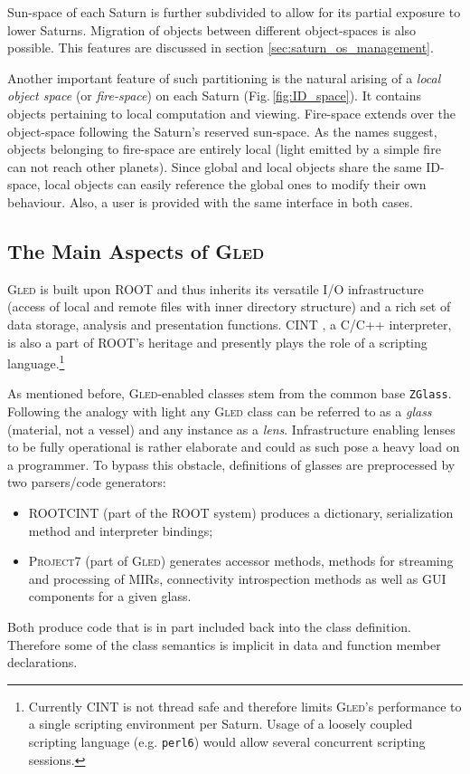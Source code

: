 \documentclass[final]{siamltex}
\def\gled{\textsc{Gled}\xspace}
\def\p7{\textsc{Project7}\xspace}
\def\smalltt#1{{\small\texttt{#1}}}
\def\foottt#1{{\footnotesize\texttt{#1}}}
\begin{document}
Sun-space of each Saturn is further subdivided to allow for its
partial exposure to lower Saturns. Migration of objects between
different object-spaces is also possible. This features are discussed
in section \ref{sec:saturn_os_management}.

Another important feature of such partitioning is the natural arising
of a \emph{local object space} (or \emph{fire-space}) on each Saturn
(Fig.\,\ref{fig:ID_space}). It contains objects pertaining to local
computation and viewing. Fire-space extends over the object-space
following the Saturn's reserved sun-space. As the names suggest,
objects belonging to fire-space are entirely local (light emitted by a
simple fire can not reach other planets). Since global and local
objects share the same ID-space, local objects can easily
reference the global ones to modify their own behaviour. Also, a
user is provided with the same interface in both cases.


\subsection{The Main Aspects of \gled}

\gled is built upon ROOT \cite{root} and thus inherits its versatile
I/O infrastructure (access of local and remote files with inner
directory structure) and a rich set of data storage, analysis and
presentation functions. CINT \cite{cint}, a C/C++ interpreter, is also
a part of ROOT's heritage and presently plays the role of a scripting
language.\footnote{Currently CINT is not thread safe and therefore
  limits \gled's performance to a single scripting environment per
  Saturn. Usage of a loosely coupled scripting language (e.g.
  \foottt{perl6}) would allow several concurrent scripting sessions.}

As mentioned before, \gled-enabled classes stem from the common base
\smalltt{ZGlass}. Following the analogy with light any \gled class can be
referred to as a \emph{glass} (material, not a vessel) and any
instance as a \emph{lens}. Infrastructure enabling lenses to be fully
operational is rather elaborate and could as such pose a heavy load on
a programmer. To bypass this obstacle, definitions of glasses are
preprocessed by two parsers/code generators:
\begin{itemize}
\item ROOTCINT (part of the ROOT system) produces
  a dictionary, serialization method and interpreter bindings;
\item \p7 (part of \gled) generates accessor methods, methods for
  streaming and processing of MIRs, connectivity introspection methods
  as well as GUI components for a given glass.
\end{itemize}
Both produce code that is in part included back into the class
definition. Therefore some of the class semantics is implicit in
data and function member declarations.
\end{document}
